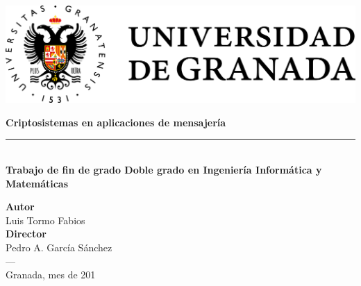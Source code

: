 \begin{titlepage}
 
 
\setlength{\centeroffset}{-0.5\oddsidemargin}
\addtolength{\centeroffset}{0.5\evensidemargin}
\thispagestyle{empty}

\noindent\hspace*{\centeroffset}\begin{minipage}{\textwidth}

\centering

 \vspace{3.3cm}

\includegraphics{imagenes/logo.png} 
 \vspace{0.5cm}


{\Huge\bfseries Criptosistemas en aplicaciones de mensajería\\
}
\noindent\rule[-1ex]{\textwidth}{3pt}\\[3.5ex]
{\large\bfseries Trabajo de fin de grado Doble grado en Ingeniería Informática y Matemáticas\\[4cm]}
\end{minipage}

\vspace{2.5cm}
\noindent\hspace*{\centeroffset}\begin{minipage}{\textwidth}
\centering

\textbf{Autor}\\ {Luis Tormo Fabios}\\[2.5ex]
\textbf{Director}\\
Pedro A. García Sánchez\\
\textsc{---}\\
Granada, mes de 201
\end{minipage}


 
\end{titlepage}


